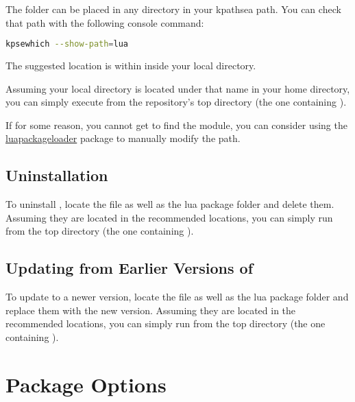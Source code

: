 \documentclass{ltxdockit}
\begin{document}
The  folder can be placed in any directory in your kpathsea path.
You can check that path with the following console command:

\begin{lstlisting}[language=bash]
  kpsewhich --show-path=lua
\end{lstlisting}

The suggested location is within  inside your
local  directory.

Assuming your local  directory is located under that name in your
home directory, you can simply execute  from the repository's
top directory (the one containing ).

If for some reason, you cannot get  to find the module, you can
consider using the
\href{https://www.ctan.org/pkg/luapackageloader}{luapackageloader} package to
manually modify the path.

\subsection{Uninstallation}

To uninstall \transconv{}, locate the  file as well as the
 lua package folder and delete them. Assuming they are located
in the recommended locations, you can simply run  from
the top directory (the one containing ).

\subsection{Updating from Earlier Versions of \transconv{}}

To update \transconv{} to a newer version, locate the 
file as well as the  lua package folder and replace them with
the new version. Assuming they are located in the recommended locations, you can
simply run  from the top directory (the one containing
).

\section{Package Options}
\end{document}
